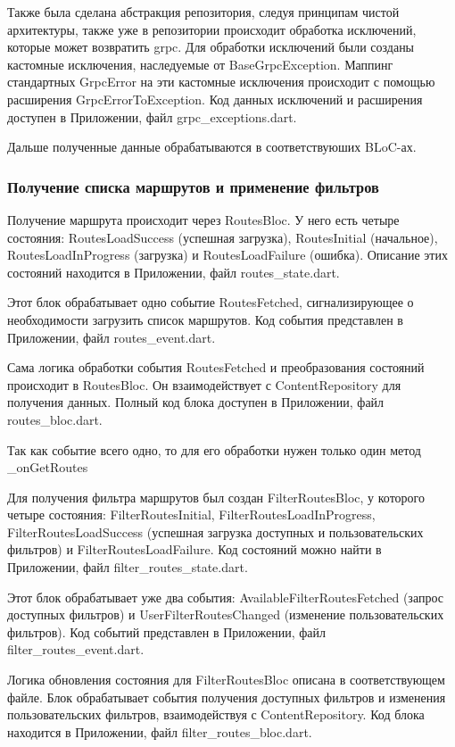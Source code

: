 Также была сделана абстракция репозитория, следуя принципам чистой архитектуры, также уже в репозитории происходит обработка исключений, которые может возвратить grpc. Для обработки исключений были созданы кастомные исключения, наследуемые от BaseGrpcException. Маппинг стандартных GrpcError на эти кастомные исключения происходит с помощью расширения GrpcErrorToException. Код данных исключений и расширения доступен в Приложении, файл grpc\_exceptions.dart.

Дальше полученные данные обрабатываются в соответствуюших BLoC-ах.

\subsubsection*{Получение списка маршрутов и применение фильтров}

Получение маршрута происходит через RoutesBloc. У него есть четыре состояния: RoutesLoadSuccess (успешная загрузка), RoutesInitial (начальное), RoutesLoadInProgress (загрузка) и RoutesLoadFailure (ошибка). Описание этих состояний находится в Приложении, файл routes\_state.dart.

Этот блок обрабатывает одно событие RoutesFetched, сигнализирующее о необходимости загрузить список маршрутов. Код события представлен в Приложении, файл routes\_event.dart.

Сама логика обработки события RoutesFetched и преобразования состояний происходит в RoutesBloc. Он взаимодействует с ContentRepository для получения данных. Полный код блока доступен в Приложении, файл routes\_bloc.dart.

Так как событие всего одно, то для его обработки нужен только один метод \_onGetRoutes

Для получения фильтра маршрутов был создан FilterRoutesBloc, у которого четыре состояния: FilterRoutesInitial, FilterRoutesLoadInProgress, FilterRoutesLoadSuccess (успешная загрузка доступных и пользовательских фильтров) и FilterRoutesLoadFailure. Код состояний можно найти в Приложении, файл filter\_routes\_state.dart.

Этот блок обрабатывает уже два события: AvailableFilterRoutesFetched (запрос доступных фильтров) и UserFilterRoutesChanged (изменение пользовательских фильтров). Код событий представлен в Приложении, файл filter\_routes\_event.dart.

Логика обновления состояния для FilterRoutesBloc описана в соответствующем файле. Блок обрабатывает события получения доступных фильтров и изменения пользовательских фильтров, взаимодействуя с ContentRepository. Код блока находится в Приложении, файл filter\_routes\_bloc.dart.

